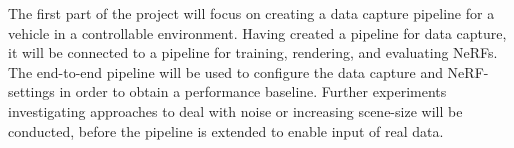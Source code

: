 The first part of the project will focus on creating a data capture pipeline for a vehicle in a controllable environment. Having created a pipeline for data capture, it will be connected to a pipeline for training, rendering, and evaluating NeRFs. The end-to-end pipeline will be used to configure the data capture and NeRF-settings in order to obtain a performance baseline. Further experiments investigating approaches to deal with noise or increasing scene-size will be conducted, before the pipeline is extended to enable input of real data.









